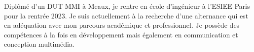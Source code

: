 

\begin{cvparagraph}

 Diplômé d'un DUT MMI à Meaux, je rentre en école d'ingénieur à l'ESIEE Paris pour la rentrée 2023. %
Je suis actuellement à la recherche d'une alternance qui est en adéquation avec mon parcours académique et professionnel. 
Je possède des compétences à la fois en développement mais également en communication et conception multimédia.
\end{cvparagraph}
